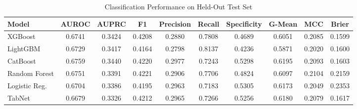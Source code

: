 \begin{table}
\centering
\caption{Classification Performance on Held-Out Test Set}
\label{tab:results}
\begin{tabular}{lccccccccc}
\toprule
Model & AUROC & AUPRC & F1 & Precision & Recall & Specificity & G-Mean & MCC & Brier \\
\midrule
XGBoost & 0.6741 & 0.3424 & 0.4208 & 0.2880 & 0.7808 & 0.4689 & 0.6051 & 0.2085 & 0.1599 \\
LightGBM & 0.6729 & 0.3417 & 0.4164 & 0.2798 & 0.8137 & 0.4236 & 0.5871 & 0.2020 & 0.1600 \\
CatBoost & 0.6759 & 0.3440 & 0.4220 & 0.2977 & 0.7243 & 0.5298 & 0.6195 & 0.2093 & 0.1603 \\
Random Forest & 0.6751 & 0.3391 & 0.4221 & 0.2906 & 0.7706 & 0.4824 & 0.6097 & 0.2104 & 0.2159 \\
Logistic Reg. & 0.6704 & 0.3386 & 0.4195 & 0.2963 & 0.7183 & 0.5305 & 0.6173 & 0.2049 & 0.2353 \\
TabNet & 0.6679 & 0.3326 & 0.4212 & 0.2965 & 0.7266 & 0.5256 & 0.6180 & 0.2079 & 0.1617 \\
\bottomrule
\end{tabular}
\end{table}
